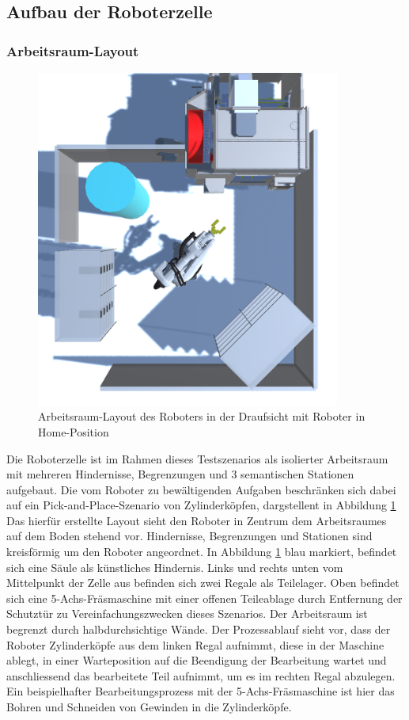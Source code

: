 \subsection{Aufbau der Roboterzelle}

\subsubsection{Arbeitsraum-Layout}

\begin{figure}[H]
	\centering
	\includegraphics[width=10cm]{Figures/Roboterzelle.png}
	\caption{Arbeitsraum-Layout des Roboters in der Draufsicht mit Roboter in
		Home-Position}
	\label{figure:arbeitsraum}
\end{figure}

Die Roboterzelle ist im Rahmen dieses Testszenarios als isolierter Arbeitsraum
mit mehreren Hindernisse, Begrenzungen und 3 semantischen Stationen aufgebaut.
Die vom Roboter zu bewältigenden Aufgaben beschränken sich dabei auf ein
Pick-and-Place-Szenario von Zylinderköpfen, dargstellent in Abbildung
\ref{figure:arbeitsraum}
\noindent
Das hierfür erstellte Layout sieht den Roboter in Zentrum dem Arbeitsraumes auf
dem Boden stehend vor. Hindernisse, Begrenzungen und Stationen sind kreisförmig
um den Roboter angeordnet. In Abbildung
\ref{figure:arbeitsraum}
blau markiert, befindet sich eine Säule als künstliches Hindernis. Links und rechts unten vom Mittelpunkt der Zelle aus befinden sich
zwei Regale als Teilelager. Oben befindet sich eine 5-Achs-Fräsmaschine mit
einer offenen Teileablage durch Entfernung der Schutztür zu
Vereinfachungszwecken dieses Szenarios. Der Arbeitsraum ist begrenzt durch
halbdurchsichtige Wände. Der Prozessablauf sieht vor, dass der Roboter
Zylinderköpfe aus dem linken Regal aufnimmt, diese in der Maschine ablegt, in
einer Warteposition auf die Beendigung der Bearbeitung wartet und anschliessend
das bearbeitete Teil aufnimmt, um es im rechten Regal abzulegen. Ein
beispielhafter Bearbeitungsprozess mit der 5-Achs-Fräsmaschine ist hier das Bohren und Schneiden von Gewinden
in die Zylinderköpfe.

